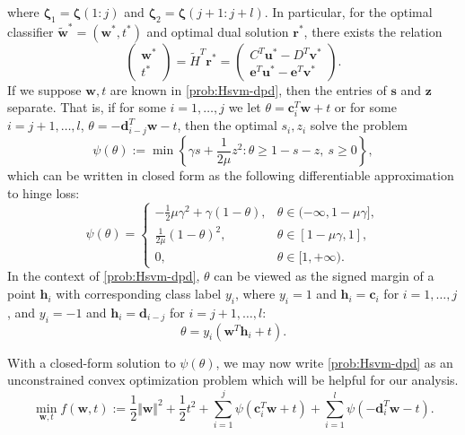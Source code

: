 \documentclass[twoside,11pt]{article}
\newcommand{\bzeta}{\bm{\zeta}}
\renewcommand{\c}{\bm{c}}
\renewcommand{\d}{\bm{d}}
\renewcommand\r{\bm{r}}
\newcommand\s{\bm{s}}
\renewcommand\u{\bm{u}}
\renewcommand\v{\bm{v}}
\newcommand\w{\bm{w}}
\newcommand\z{\bm{z}}
\newcommand\e{\bm{e}}
\newcommand\tw{\tilde{\w}}
\newcommand\h{\bm{h}}
\newcommand\tH{\tilde{H}}
\begin{document}
where $\bzeta_1 = \bzeta(1:j)$ and $\bzeta_2 = \bzeta(j+1:j+l)$. In particular, for the optimal classifier $\tw^* = (\w^*,t^*)$ and optimal dual solution $\r^*$, there exists the relation
\begin{equation} \label{eqn:p-d-opt-reln}
    \begin{pmatrix}
        \w^*\\
        t^*
    \end{pmatrix} = \tH^T\r^* = \begin{pmatrix}
        C^T\u^* - D^T\v^*\\
        \e^T\u^* - \e^T\v^*
    \end{pmatrix}.
\end{equation}
If we suppose $\w,t$ are known in \eqref{prob:Hsvm-dpd}, then the entries
of $\s$ and $\z$ separate. That is, if for some $i = 1,\hdots,j$ we let $\theta = \c_i^T\w + t$ or for some $i=j+1,\hdots,l$, $\theta = -\d_{i-j}^T\w - t$, then the optimal $s_i,z_i$ solve the problem
\begin{equation} \label{eqn:psi-min}
  \psi(\theta) := \min\left\{ \gamma s + \frac{1}{2\mu}z^2 : \theta \geq 1 - s - z,\ s \geq 0\right\},
\end{equation}
which can be written in closed form as the following differentiable approximation to hinge loss:
\begin{equation} \label{eqn:psi-cc}
  \psi(\theta) = \begin{cases}
    -\frac{1}{2}\mu\gamma^2 + \gamma(1-\theta), & \theta \in (-\infty, 1 - \mu\gamma],\\
    \frac{1}{2\mu}(1-\theta)^2, & \theta \in [1-\mu\gamma,1],\\
    0, & \theta \in [1,+\infty).
  \end{cases}
\end{equation}
In the context of \eqref{prob:Hsvm-dpd}, $\theta$ can be viewed as the signed margin of a point $\h_i$ with corresponding class label $y_i$,
where $y_i = 1$ and $\h_i = \c_i$ for $i=1,\hdots,j$, and $y_i = -1$ and $\h_i = \d_{i-j}$ for $i=j+1,\hdots,l$:
\[
  \theta = y_i(\w^T\h_i + t).
\]


With a closed-form solution to $\psi(\theta)$, we may now write \eqref{prob:Hsvm-dpd} as an unconstrained convex optimization problem
which will be helpful for our analysis.
\begin{equation} \label{eqn:Hsvm-dpd}
  \min_{\w,t} f(\w,t):= \frac{1}{2}\Vert\w\Vert^2 + \frac{1}{2}t^2 + \sum_{i=1}^j\psi(\c_i^T\w+t)+\sum_{i=1}^l\psi(-\d_i^T\w-t).
\end{equation}
\end{document}
